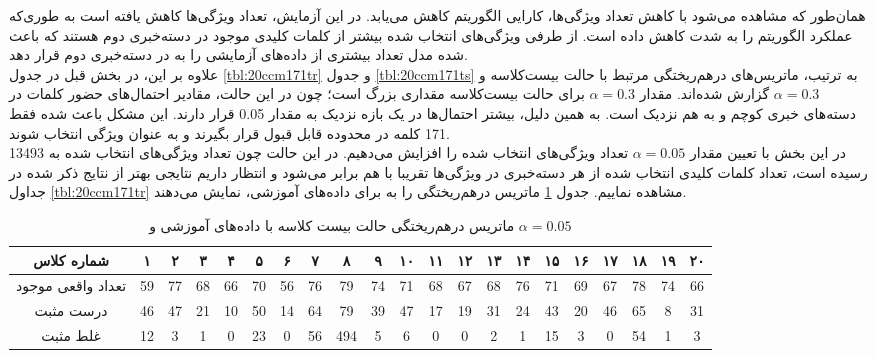 \documentclass[11.5pt,a4paper]{article}
\begin{document}
همان‌طور که مشاهده می‌شود با کاهش تعداد ویژگی‌ها،‌ کارایی الگوریتم کاهش می‌یابد. در این آزمایش، تعداد ویژگی‌ها کاهش‌ یافته است به طوری‌که عملکرد الگوریتم را به شدت کاهش داده است. از طرفی ویژگی‌های انتخاب شده بیشتر از کلمات کلیدی موجود در دسته‌خبری دوم هستند که باعث شده مدل تعداد بیشتری از داده‌های آزمایشی را به در دسته‌خبری دوم قرار دهد. 
\\

علاوه بر این، در بخش قبل در جدول 
\ref{tbl:20ccm171tr} 
و جدول
\ref{tbl:20ccm171ts}
به ترتیب،‌ ماتریس‌های درهم‌ریختگی مرتبط با حالت بیست‌کلاسه و $\alpha = 0.3$ گزارش شده‌اند. مقدار $\alpha = 0.3 $ برای حالت بیست‌کلاسه مقداری بزرگ است؛ چون در این حالت، مقادیر احتمال‌های حضور کلمات در دسته‌های خبری کوچم و به هم نزدیک است. به همین دلیل،‌ بیشتر احتمال‌ها در یک بازه نزدیک به مقدار 0.05 قرار دارند. این مشکل باعث شده فقط 171 کلمه در محدوده قابل قبول قرار بگیرند و به عنوان ویژگی انتخاب شوند.\\
در این بخش با تعیین مقدار $\alpha = 0.05$ تعداد ویژگی‌های انتخاب شده را افزایش می‌دهیم. در این حالت چون تعداد ویژگی‌های انتخاب شده به 13493 رسیده است،‌ تعداد کلمات کلیدی انتخاب شده از هر دسته‌خبری در ویژگی‌ها تقریبا با هم برابر می‌شود و انتظار داریم نتایجی بهتر از نتایج ذکر 
شده در جداول 
\ref{tbl:20ccm171tr} 
مشاهده نماییم. جدول 
\ref{tbl:20ccm2000tr}
ماتریس درهم‌ریختگی را به برای داده‌های آموزشی، نمایش می‌دهند.
\\

\begin{table}[h]
\center
\caption{ماتریس درهم‌ریختگی حالت بیست کلاسه با داده‌های آموزشی و $\alpha = 0.05$}
\label{tbl:20ccm2000tr}
\begin{tabular}{c | c | c | c | c | c | c | c | c | c | c | c | c | c | c | c | c | c | c | c | c }
  شماره کلاس & ۱ & ۲ & ۳ & ۴ & ۵ & ۶ & ۷ & ۸ & ۹ & ۱۰ & ۱۱ & ۱۲ & ۱۳ & ۱۴ & ۱۵ & ۱۶ & ۱۷ & ۱۸ & ۱۹ & ۲۰ \\
\hline
\hline
تعداد واقعی موجود& 59  &  77  &  68  &  66  &  70  &  56  &  76  &  79  &  74  &  71  & 68   &  67  &  68  &  76  &  71  &  69  &  67  &  78  &  74  &   66 \\
درست مثبت& 46  &  47  &  21  &  10  &  50  &  14  &  64  &  79  &  39  &  47  &  17  &  19  & 31   &  24  &  43  &  20  &  46  &  65 &  8  &  31  \\
غلط مثبت& 12 &  3  & 1   & 0  &  23  &  0  &  56  &  494  &  5  & 6   &  0  &  0  & 2   &  1 &  15  & 3  &  0  &  54  &  1  &  3  \\

\end{tabular}
\end{table}
\end{document}
